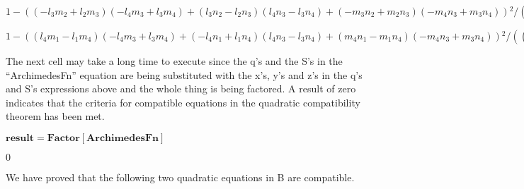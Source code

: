 \documentclass{article}
\begin{document}
\begin{doublespace}
\noindent\(1-\left(\left(-l_3 m_2+l_2 m_3\right) \left(-l_4 m_3+l_3 m_4\right)+\left(l_3 n_2-l_2 n_3\right) \left(l_4 n_3-l_3 n_4\right)+\left(-m_3
n_2+m_2 n_3\right) \left(-m_4 n_3+m_3 n_4\right)\right){}^2/\left(\left(\left(-l_3 m_2+l_2 m_3\right){}^2+\left(l_3 n_2-l_2 n_3\right){}^2+\left(-m_3
n_2+m_2 n_3\right){}^2\right) \left(\left(-l_4 m_3+l_3 m_4\right){}^2+\left(l_4 n_3-l_3 n_4\right){}^2+\left(-m_4 n_3+m_3 n_4\right){}^2\right)\right)\)
\end{doublespace}

\begin{doublespace}
\noindent\(1-\left(\left(l_4 m_1-l_1 m_4\right) \left(-l_4 m_3+l_3 m_4\right)+\left(-l_4 n_1+l_1 n_4\right) \left(l_4 n_3-l_3 n_4\right)+\left(m_4
n_1-m_1 n_4\right) \left(-m_4 n_3+m_3 n_4\right)\right){}^2/\left(\left(\left(l_4 m_1-l_1 m_4\right){}^2+\left(-l_4 n_1+l_1 n_4\right){}^2+\left(m_4
n_1-m_1 n_4\right){}^2\right) \left(\left(-l_4 m_3+l_3 m_4\right){}^2+\left(l_4 n_3-l_3 n_4\right){}^2+\left(-m_4 n_3+m_3 n_4\right){}^2\right)\right)\)
\end{doublespace}

The next cell may take a long time to execute since the q{'}s and the S{'}s in the {``}ArchimedesFn{''} equation are being substituted with the x{'}s,
y{'}s and z{'}s in the q{'}s and S{'}s expressions above and the whole thing is being factored. A result of zero indicates that the criteria for
compatible equations in the quadratic compatibility theorem has been met.

\begin{doublespace}
\noindent\(\pmb{\text{result} = \text{Factor}[\text{ArchimedesFn} ]}\)
\end{doublespace}

\begin{doublespace}
\noindent\(0\)
\end{doublespace}

We have proved that the following two quadratic equations in B are compatible.
\end{document}
